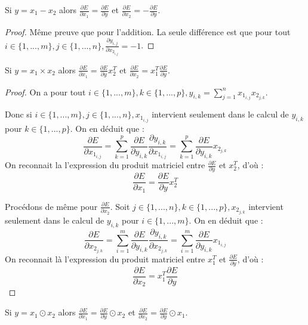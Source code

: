\begin{proposition}
Si $y = x_1 - x_2$ alors $\frac{\partial E}{\partial x_1} = \frac{\partial E}{\partial y}$ et $\frac{\partial E}{\partial x_2} = -\frac{\partial E}{\partial y}$.
\end{proposition}

\begin{proof}
Même preuve que pour l'addition. La seule différence est que pour tout $i \in \{1, ..., m\}, j \in \{1, ..., n\}, \frac{\partial y_{i, j}}{\partial x_{2_{i, j}}} = -1$.
\end{proof}

\begin{proposition}
Si $y = x_1 \times x_2$ alors $\frac{\partial E}{\partial x_1} = \frac{\partial E}{\partial y} x_2^T$ et $\frac{\partial E}{\partial x_2} = x_1^T \frac{\partial E}{\partial y}$.
\end{proposition}

\begin{proof}
On a pour tout $i \in \{1, ..., m\}, k \in \{1, ..., p\}, y_{i, k} = \sum_{j = 1}^{n}{x_{1_{i, j}}x_{2_{j, k}}}$.

Donc si $i \in \{1, ..., m\}, j \in \{1, ..., n\}, x_{1_{i, j}}$ intervient seulement dans le calcul de $y_{i, k}$ pour $k \in \{1, ..., p\}$. On en déduit que :
$$
\frac{\partial E}{\partial x_{1_{i, j}}} = \sum_{k = 1}^{p}{\frac{\partial E}{\partial y_{i, k}}\frac{\partial y_{i, k}}{\partial x_{1_{i, j}}}} = \sum_{k = 1}^{p}{\frac{\partial E}{\partial y_{i, k}}x_{2_{j, k}}} 
$$ 
On reconnait la l'expression du produit matriciel entre $\frac{\partial E}{\partial y}$ et $x_2^T$, d'où :
$$
\frac{\partial E}{\partial x_1} = \frac{\partial E}{\partial y} x_2^T
$$

Procédons de même pour $\frac{\partial E}{\partial x_2}$. Soit $j \in \{1, ..., n\}, k \in \{1, ..., p\}, x_{2_{j, k}}$ intervient seulement dans le calcul de $y_{i, k}$ pour $i \in \{1, ..., m\}$. On en déduit que :
$$
\frac{\partial E}{\partial x_{2_{j, k}}} = \sum_{i = 1}^{m}{\frac{\partial E}{\partial y_{i, k}}\frac{\partial y_{i, k}}{\partial x_{2_{j, k}}}} = \sum_{i = 1}^{m}{\frac{\partial E}{\partial y_{i, k}}x_{1_{i, j}}} 
$$ 
On reconnait là l'expression du produit matriciel entre $x_1^T$ et $\frac{\partial E}{\partial y}$, d'où :
$$
\frac{\partial E}{\partial x_2} = x_1^T \frac{\partial E}{\partial y}
$$
\end{proof}

\begin{proposition}
Si $y = x_1 \odot x_2$ alors $\frac{\partial E}{\partial x_1} = \frac{\partial E}{\partial y} \odot x_2$ et $\frac{\partial E}{\partial x_2} = \frac{\partial E}{\partial y} \odot x_1$.
\end{proposition}

